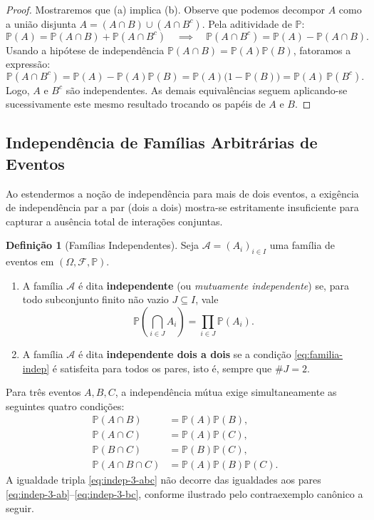 \documentclass[12pt,portuguese]{article}
\theoremstyle{definition}
\newtheorem{definition}[definition]{Definição}
\begin{document}
\begin{proof}
Mostraremos que (a) implica (b). Observe que podemos decompor \(A\) como a união disjunta \(A = (A \cap B) \cup (A \cap B^c)\). Pela aditividade de \(\mathbb{P}\):
\[
  \mathbb{P}(A) = \mathbb{P}(A \cap B) + \mathbb{P}(A \cap B^c)
  \quad\implies\quad
  \mathbb{P}(A \cap B^c) = \mathbb{P}(A) - \mathbb{P}(A \cap B).
\]
Usando a hipótese de independência \(\mathbb{P}(A \cap B) = \mathbb{P}(A)\mathbb{P}(B)\), fatoramos a expressão:
\[
  \mathbb{P}(A \cap B^c) = \mathbb{P}(A) - \mathbb{P}(A)\mathbb{P}(B) = \mathbb{P}(A)\big(1 - \mathbb{P}(B)\big) = \mathbb{P}(A)\,\mathbb{P}(B^c).
\]
Logo, \(A\) e \(B^c\) são independentes. As demais equivalências seguem aplicando-se sucessivamente este mesmo resultado trocando os papéis de \(A\) e \(B\).
\end{proof}

\subsection{Independência de Famílias Arbitrárias de Eventos}

Ao estendermos a noção de independência para mais de dois eventos, a exigência de independência par a par (dois a dois) mostra-se estritamente insuficiente para capturar a ausência total de interações conjuntas.

\begin{definition}[Famílias Independentes]\label{def:familia-indep}
Seja \(\mathcal{A} = (A_i)_{i \in I}\) uma família de eventos em \((\Omega, \mathcal{F}, \mathbb{P})\).
\begin{enumerate}[label=(\alph*)]
  \item A família \(\mathcal{A}\) é dita \textbf{independente} (ou \emph{mutuamente independente}) se, para todo subconjunto finito não vazio \(J \subseteq I\), vale
  \begin{equation}\label{eq:familia-indep}
    \mathbb{P}\left(\bigcap_{i \in J} A_i\right) = \prod_{i \in J} \mathbb{P}(A_i).
  \end{equation}
  \item A família \(\mathcal{A}\) é dita \textbf{independente dois a dois} se a condição \eqref{eq:familia-indep} é satisfeita para todos os pares, isto é, sempre que \(\#J = 2\).
\end{enumerate}
\end{definition}

Para três eventos \(A, B, C\), a independência mútua exige simultaneamente as seguintes quatro condições:
\begin{align}
  \mathbb{P}(A \cap B) &= \mathbb{P}(A)\mathbb{P}(B), \label{eq:indep-3-ab} \\
  \mathbb{P}(A \cap C) &= \mathbb{P}(A)\mathbb{P}(C), \label{eq:indep-3-ac} \\
  \mathbb{P}(B \cap C) &= \mathbb{P}(B)\mathbb{P}(C), \label{eq:indep-3-bc} \\
  \mathbb{P}(A \cap B \cap C) &= \mathbb{P}(A)\mathbb{P}(B)\mathbb{P}(C). \label{eq:indep-3-abc}
\end{align}
A igualdade tripla \eqref{eq:indep-3-abc} não decorre das igualdades aos pares \eqref{eq:indep-3-ab}--\eqref{eq:indep-3-bc}, conforme ilustrado pelo contraexemplo canônico a seguir.
\end{document}
